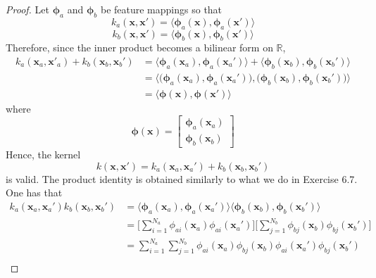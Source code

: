 \vspace{1em}

\begin{proof}
    Let $\bm{\phi}_a$ and $\bm{\phi}_b$ be feature mappings so that
    \[
        k_a(\mathbf{x}, \mathbf{x}') 
        = \langle\bm{\phi}_a(\mathbf{x}), \bm{\phi}_a(\mathbf{x}')\rangle
    \] 
    \[
        k_b(\mathbf{x}, \mathbf{x}') 
        = \langle\bm{\phi}_b(\mathbf{x}), \bm{\phi}_b(\mathbf{x}')\rangle
    \] 
    Therefore, since the inner product becomes a bilinear form on $\mathbb{R}$,
    \begin{align*}
        k_a(\mathbf{x}_a, \mathbf{x'}_a) + k_b(\mathbf{x}_b, \mathbf{x}_b')
        &= \langle\bm{\phi}_a(\mathbf{x}_a), \bm{\phi}_a(\mathbf{x}_a')\rangle
        + \langle\bm{\phi}_b(\mathbf{x}_b), \bm{\phi}_b(\mathbf{x}_b')\rangle \\
        &= \langle \big(\bm{\phi}_a(\mathbf{x}_a), \bm{\phi}_a(\mathbf{x}_a')\big),
        \big(\bm{\phi}_b(\mathbf{x}_b), \bm{\phi}_b(\mathbf{x}_b')\big) \rangle \\
        &= \langle \bm{\phi}(\mathbf{x}), \bm{\phi}(\mathbf{x'}) \rangle
    \end{align*}
    where
    \[
        \bm{\phi}(\mathbf{x}) = 
        \begin{bmatrix}
            \bm{\phi}_a(\mathbf{x}_a) \\
            \bm{\phi}_b(\mathbf{x}_b)
        \end{bmatrix}
    \] 
    Hence, the kernel 
    \begin{equation*}
        k(\mathbf{x}, \mathbf{x}') = 
        k_a(\mathbf{x}_a, \mathbf{x}_a') +
        k_b(\mathbf{x}_b, \mathbf{x}_b')
        \tag{6.21}\label{eq:6.21}
    \end{equation*}
    is valid. The product identity is obtained similarly to
    what we do in Exercise 6.7. One has that
    \begin{align*}
        k_a(\mathbf{x}_a, \mathbf{x}_a')k_b(\mathbf{x}_b, \mathbf{x}_b')
        &= \langle\bm{\phi}_a(\mathbf{x}_a), \bm{\phi}_a(\mathbf{x}_a')\rangle
        \langle\bm{\phi}_b(\mathbf{x}_b), \bm{\phi}_b(\mathbf{x}_b')\rangle \\
        &= \bigg[\sum_{i=1}^{N_a} \phi_{ai}(\mathbf{x}_a) \phi_{ai}(\mathbf{x}_a')\bigg]
        \bigg[\sum_{j=1}^{N_b} \phi_{bj}(\mathbf{x}_b) \phi_{bj}(\mathbf{x}_b')\bigg] \\
        &= \sum_{i=1}^{N_a} \sum_{j=1}^{N_b}
        \phi_{ai}(\mathbf{x}_a) \phi_{bj}(\mathbf{x}_b)
        \phi_{ai}(\mathbf{x}_a') \phi_{bj}(\mathbf{x}_b') \\

\end{align*}
\end{proof}

